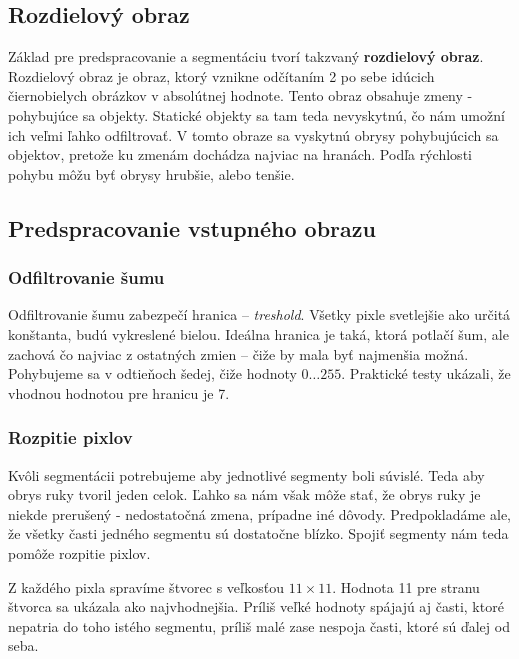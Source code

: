 \subsection{Rozdielový obraz}\label{chap:diffimg}

Základ pre predspracovanie a segmentáciu tvorí takzvaný \textbf{rozdielový obraz}. Rozdielový obraz je obraz, ktorý vznikne odčítaním 2 po sebe idúcich čiernobielych obrázkov v absolútnej hodnote. Tento obraz obsahuje zmeny - pohybujúce sa objekty. Statické objekty sa tam teda nevyskytnú, čo nám umožní ich veľmi ľahko odfiltrovať. V tomto obraze sa vyskytnú obrysy pohybujúcich sa objektov, pretože ku zmenám dochádza najviac na hranách. Podľa rýchlosti pohybu môžu byť obrysy hrubšie, alebo tenšie. 

\subsection{Predspracovanie vstupného obrazu}\label{chap:preprocess}



\subsubsection{Odfiltrovanie šumu}
Odfiltrovanie šumu zabezpečí hranica -- \textit{treshold}. Všetky pixle svetlejšie ako určitá konštanta, budú vykreslené bielou. Ideálna hranica je taká, ktorá potlačí šum, ale zachová čo najviac z ostatných zmien -- čiže by mala byť najmenšia možná. Pohybujeme sa v odtieňoch šedej, čiže hodnoty $0\dots 255$. Praktické testy ukázali, že vhodnou hodnotou pre hranicu je 7.

\subsubsection{Rozpitie pixlov}

Kvôli segmentácii potrebujeme aby jednotlivé segmenty boli súvislé. Teda aby obrys ruky tvoril jeden celok.
Ľahko sa nám však môže stať, že obrys ruky je niekde prerušený - nedostatočná zmena, prípadne iné dôvody. Predpokladáme ale, že všetky časti jedného segmentu sú dostatočne blízko. Spojiť segmenty nám teda pomôže rozpitie pixlov. 

Z každého pixla spravíme štvorec s veľkosťou $11\times 11$.
Hodnota 11 pre stranu štvorca sa ukázala ako najvhodnejšia. 
Príliš veľké hodnoty spájajú aj časti, ktoré nepatria do toho istého segmentu, príliš malé zase nespoja časti, ktoré sú ďalej od seba.


